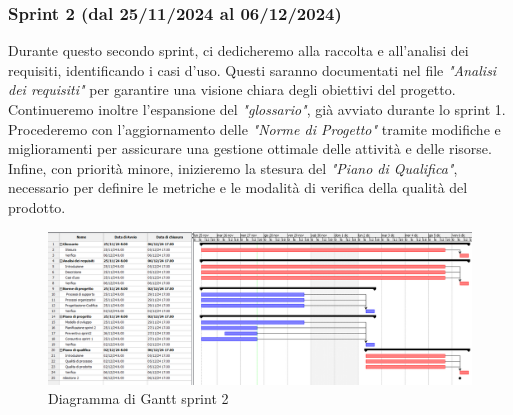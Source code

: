         \subsubsection{Sprint 2 (dal 25/11/2024 al 06/12/2024)}
     Durante questo secondo sprint, ci dedicheremo alla raccolta e all'analisi dei requisiti, identificando i casi d'uso. Questi saranno documentati nel file \textit{"Analisi dei requisiti"} per garantire una visione chiara degli obiettivi del progetto. Continueremo inoltre l'espansione del \textit{"glossario"}, già avviato durante lo sprint 1.  Procederemo con l'aggiornamento delle \textit{"Norme di Progetto"} tramite modifiche e miglioramenti per assicurare una gestione ottimale delle attività e delle risorse. Infine, con priorità minore, inizieremo la stesura del \textit{"Piano di Qualifica"}, necessario per definire le metriche e le modalità di 
     verifica della qualità del prodotto.

        
        \begin{figure}[h!]
            \centering
            \includegraphics[scale = 0.3]{template/images/gantt2.png}
            \caption{Diagramma di Gantt sprint 2}
            \label{fig:3.2} %
        \end{figure}
 
